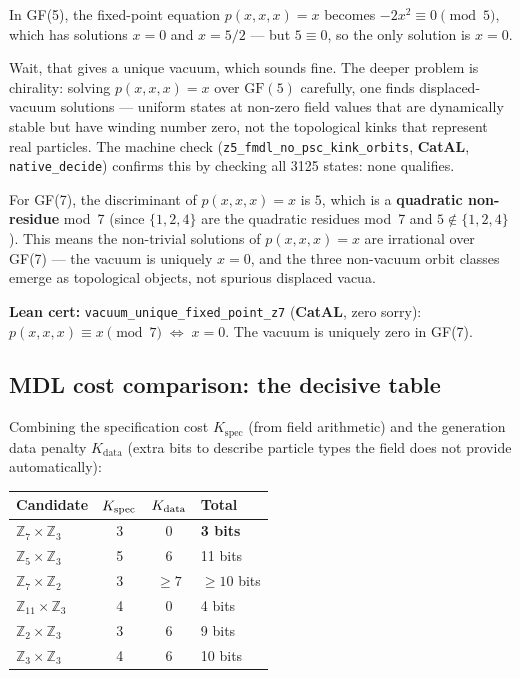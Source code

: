 \documentclass[11pt,a4paper]{article}
\newcommand{\term}[1]{\textbf{#1}}
\newcommand{\lean}[1]{\texttt{#1}}
\newcommand{\CatAL}{\textbf{CatAL}}
\theoremstyle{definition}
\begin{document}
\begin{tcolorbox}[colback=boxgray,colframe=gray!50!black,
  title={Why GF(5) has no particles: the displaced-vacuum argument}]
In GF(5), the fixed-point equation $p(x,x,x) = x$ becomes
$-2x^2 \equiv 0 \pmod 5$, which has solutions $x = 0$ and $x = 5/2$ ---
but $5 \equiv 0$, so the only solution is $x = 0$.

Wait, that gives a unique vacuum, which sounds fine.  The deeper problem
is chirality: solving $p(x,x,x) = x$ over $\mathrm{GF}(5)$ carefully,
one finds displaced-vacuum solutions --- uniform states at non-zero field
values that are dynamically stable but have winding number zero, not the
topological kinks that represent real particles.
The machine check
(\lean{z5\_fmdl\_no\_psc\_kink\_orbits}, \CatAL, \texttt{native\_decide})
confirms this by checking all 3125 states: none qualifies.

For GF(7), the discriminant of $p(x,x,x) = x$ is $5$, which is a
\term{quadratic non-residue} mod~7 (since $\{1,2,4\}$ are the quadratic
residues mod~7 and $5 \notin \{1,2,4\}$).  This means the non-trivial
solutions of $p(x,x,x) = x$ are irrational over GF(7) --- the vacuum
is uniquely $x = 0$, and the three non-vacuum orbit classes emerge
as topological objects, not spurious displaced vacua.
\end{tcolorbox}

\bigskip
\noindent
\textbf{Lean cert:}
\lean{vacuum\_unique\_fixed\_point\_z7} (\CatAL, zero sorry):
$p(x,x,x) \equiv x \pmod 7 \;\Leftrightarrow\; x = 0$.
The vacuum is uniquely zero in GF(7).

\subsection{MDL cost comparison: the decisive table}

Combining the specification cost $K_{\mathrm{spec}}$ (from field arithmetic)
and the generation data penalty $K_{\mathrm{data}}$ (extra bits to describe
particle types the field does not provide automatically):

\begin{center}
\begin{tabular}{@{}lccl@{}}
\toprule
Candidate & $K_{\rm spec}$ & $K_{\rm data}$ & Total \\
\midrule
$\mathbb{Z}_7\times\mathbb{Z}_3$ & 3 & 0 & \textbf{3 bits} \\
$\mathbb{Z}_5\times\mathbb{Z}_3$ & 5 & 6 & 11 bits \\
$\mathbb{Z}_7\times\mathbb{Z}_2$ & 3 & $\geq 7$ & $\geq 10$ bits \\
$\mathbb{Z}_{11}\times\mathbb{Z}_3$ & 4 & 0 & 4 bits \\
$\mathbb{Z}_2\times\mathbb{Z}_3$ & 3 & 6 & 9 bits \\
$\mathbb{Z}_3\times\mathbb{Z}_3$ & 4 & 6 & 10 bits \\
\bottomrule
\end{tabular}
\end{center}
\end{document}
